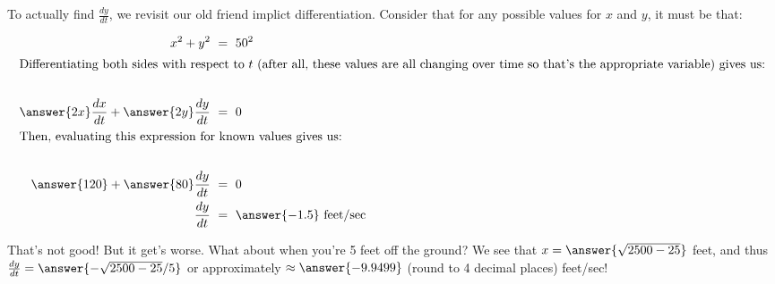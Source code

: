 \documentclass{ximera}
\begin{document}
\begin{question}
\begin{explanation}
\begin{image}
\end{image}

To actually find $\frac{dy}{dt}$, we revisit our old friend implict differentiation.  Consider that for any possible values for $x$ and $y$, it must be that:

\begin{align*}
x^2+ y^2 &\ =\ 50^2\\
\intertext{Differentiating both sides with respect to $t$ (after all, these values are all changing over time so that's the appropriate variable) gives us:}\\
\answer{2x}\frac{dx}{dt}+\answer{2y}\frac{dy}{dt}&\ =\ 0\\
\intertext{Then, evaluating this expression for known values gives us:}\\
\answer{120}+\answer{80}\frac{dy}{dt}&\ =\ 0\\
\frac{dy}{dt}&\ =\ \answer{-1.5}\ \text{feet/sec}
\end{align*}

That's not good!  But it get's worse.  What about when you're 5 feet off the ground?  We see that $x=\answer{\sqrt{2500-25}}$ feet, and thus $\frac{dy}{dt}=\answer{-\sqrt{2500-25}/5}$ or approximately $\approx \answer{-9.9499}$ (round to 4 decimal places) feet/sec!


\end{explanation}

\end{question}
\end{document}
